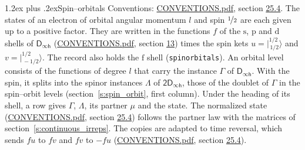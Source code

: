 \documentclass[10pt,a4paper]{article}
\makeatletter
\renewcommand\section{\@startsection{section}{1}{\z@}{-3ex plus -1ex minus -.2ex}%
  {1.2ex plus .2ex}{\normalfont\large\sffamily\bfseries\color{parttitle}}}
\numberwithin{equation}{section}
\newcommand{\grp}[1]{\mathsf{#1}}
\newcommand{\orbital}[1]{\mathrm{#1}}
\newcommand{\intx}{\mu}
\newcommand{\jm}[2]{\bigl\lvert{}^{#1}_{\,#2}\bigr\rangle}
\makeatother
\begin{document}
\section{Spin--orbitals}\label{s:spin_orbitals}
Conventions: \href{../../CONVENTIONS.pdf}{CONVENTIONS.pdf}, section \href{../../CONVENTIONS.pdf\#conv.25.4}{25.4}.
\leavevmode\label{n:index.orbital.l}The states of an electron of orbital angular momentum $l$ and spin $\nicefrac{1}{2}$ are each given up to a positive factor. \label{n:local.spinor.uv}\label{n:local.function.f}They are written in the functions $f$ of the $\orbital{s}$, $\orbital{p}$ and $\orbital{d}$ shells of \href{../../../rotation/data/pdf/Dinfh.pdf}{$\grp{D_{\infty h}}$} (\href{../../CONVENTIONS.pdf}{CONVENTIONS.pdf}, section \href{../../../rotation/CONVENTIONS.pdf\#conv.13}{13}) times the spin kets $u = \jm{1/2}{1/2}$ and $v = \jm{1/2}{-1/2}$. The record also holds the $\orbital{f}$ shell (\texttt{spinorbitals}). An orbital level consists of the functions of degree $l$ that carry the instance $\Gamma$ of \href{../../../rotation/data/pdf/Dinfh.pdf}{$\grp{D_{\infty h}}$}. With the spin, it splits into the spinor instances $\Lambda$ of $\grp{2D_{\infty h}}$, those of the doublet of $\Gamma$ in the spin--orbit levels (section~\ref{s:spin_orbit}, first column). \label{n:head.state}Under the heading of its shell, a row gives $\Gamma$, $\Lambda$, its partner $\intx$ and the state. The normalized state (\href{../../CONVENTIONS.pdf}{CONVENTIONS.pdf}, section \href{../../CONVENTIONS.pdf\#conv.25.4}{25.4}) follows the partner law with the matrices of section~\ref{s:continuous_irreps}. The copies are adapted to time reversal, which sends $f u$ to $f v$ and $f v$ to $-f u$ (\href{../../CONVENTIONS.pdf}{CONVENTIONS.pdf}, section \href{../../CONVENTIONS.pdf\#conv.25.4}{25.4}).
\end{document}
